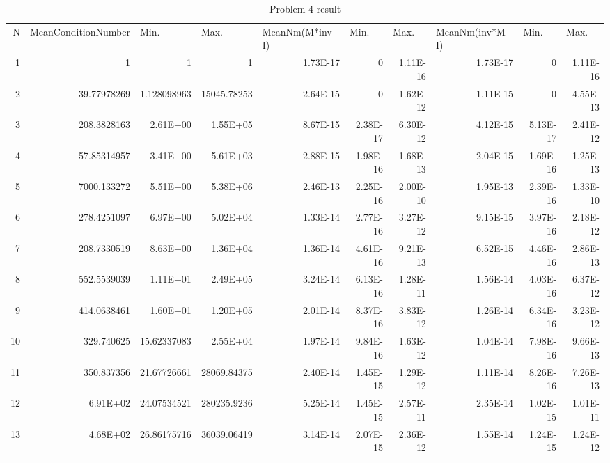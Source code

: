 \documentclass[12pt]{article}
\begin{document}
\begin{enumerate}
\begin{landscape}
    \end{landscape}
  \begin{landscape}
\begin{table}[htbp]
  \centering
  \small
  \tabcolsep=0.11cm
  \caption{Problem 4 result}
    \begin{tabular}{rrrrrrrrrr}
    N     & \multicolumn{1}{l}{MeanConditionNumber} & \multicolumn{1}{l}{Min.} & \multicolumn{1}{l}{Max.} & \multicolumn{1}{l}{MeanNm(M*inv-I)} & \multicolumn{1}{l}{Min.} & \multicolumn{1}{l}{Max.} & \multicolumn{1}{l}{MeanNm(inv*M-I)} & \multicolumn{1}{l}{Min.} & \multicolumn{1}{l}{Max.} \\
    1     & 1     & 1     & 1     & 1.73E-17 & 0     & 1.11E-16 & 1.73E-17 & 0     & 1.11E-16 \\
    2     & 39.77978269 & 1.128098963 & 15045.78253 & 2.64E-15 & 0     & 1.62E-12 & 1.11E-15 & 0     & 4.55E-13 \\
    3     & 208.3828163 & 2.61E+00 & 1.55E+05 & 8.67E-15 & 2.38E-17 & 6.30E-12 & 4.12E-15 & 5.13E-17 & 2.41E-12 \\
    4     & 57.85314957 & 3.41E+00 & 5.61E+03 & 2.88E-15 & 1.98E-16 & 1.68E-13 & 2.04E-15 & 1.69E-16 & 1.25E-13 \\
    5     & 7000.133272 & 5.51E+00 & 5.38E+06 & 2.46E-13 & 2.25E-16 & 2.00E-10 & 1.95E-13 & 2.39E-16 & 1.33E-10 \\
    6     & 278.4251097 & 6.97E+00 & 5.02E+04 & 1.33E-14 & 2.77E-16 & 3.27E-12 & 9.15E-15 & 3.97E-16 & 2.18E-12 \\
    7     & 208.7330519 & 8.63E+00 & 1.36E+04 & 1.36E-14 & 4.61E-16 & 9.21E-13 & 6.52E-15 & 4.46E-16 & 2.86E-13 \\
    8     & 552.5539039 & 1.11E+01 & 2.49E+05 & 3.24E-14 & 6.13E-16 & 1.28E-11 & 1.56E-14 & 4.03E-16 & 6.37E-12 \\
    9     & 414.0638461 & 1.60E+01 & 1.20E+05 & 2.01E-14 & 8.37E-16 & 3.83E-12 & 1.26E-14 & 6.34E-16 & 3.23E-12 \\
    10    & 329.740625 & 15.62337083 & 2.55E+04 & 1.97E-14 & 9.84E-16 & 1.63E-12 & 1.04E-14 & 7.98E-16 & 9.66E-13 \\
    11    & 350.837356 & 21.67726661 & 28069.84375 & 2.40E-14 & 1.45E-15 & 1.29E-12 & 1.11E-14 & 8.26E-16 & 7.26E-13 \\
    12    & 6.91E+02 & 24.07534521 & 280235.9236 & 5.25E-14 & 1.45E-15 & 2.57E-11 & 2.35E-14 & 1.02E-15 & 1.01E-11 \\
    13    & 4.68E+02 & 26.86175716 & 36039.06419 & 3.14E-14 & 2.07E-15 & 2.36E-12 & 1.55E-14 & 1.24E-15 & 1.24E-12 \\

\end{tabular}
\end{table}
\end{landscape}
\end{enumerate}
\end{document}

